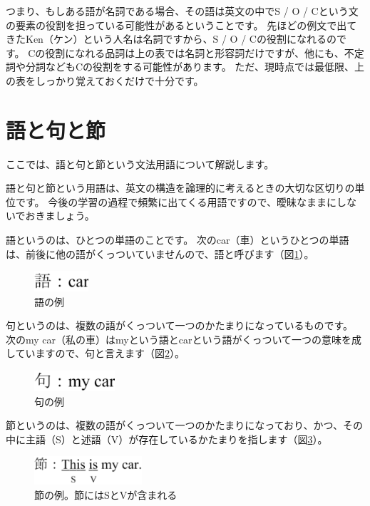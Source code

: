 \documentclass[12pt,titlepage]{jsarticle}
\begin{document}
 つまり、もしある語が名詞である場合、その語は英文の中でS / O / Cという文の要素の役割を担っている可能性があるということです。
 先ほどの例文で出てきたKen（ケン）という人名は名詞ですから、S / O / Cの役割になれるのです。
 Cの役割になれる品詞は上の表では名詞と形容詞だけですが、他にも、不定詞や分詞などもCの役割をする可能性があります。
 ただ、現時点では最低限、上の表をしっかり覚えておくだけで十分です。


 \section{語と句と節}
 ここでは、語と句と節という文法用語について解説します。
 
 語と句と節という用語は、英文の構造を論理的に考えるときの大切な区切りの単位です。
 今後の学習の過程で頻繁に出てくる用語ですので、曖昧なままにしないでおきましょう。

 語というのは、ひとつの単語のことです。
 次のcar（車）というひとつの単語は、前後に他の語がくっついていませんので、語と呼びます（図\ref{fig4}）。
  \begin{figure}[htbp]
   \begin{center}
    \includegraphics[width=2cm]{./figure/fig4.pdf}
    \caption{語の例}
    \label{fig4}
   \end{center}
  \end{figure}

  句というのは、複数の語がくっついて一つのかたまりになっているものです。
  次のmy car（私の車）はmyという語とcarという語がくっついて一つの意味を成していますので、句と言えます（図\ref{fig5}）。
  \begin{figure}[htbp]
   \begin{center}
    \includegraphics[width=3cm]{./figure/fig5.pdf}
    \caption{句の例}
    \label{fig5}
   \end{center}
  \end{figure}


  節というのは、複数の語がくっついて一つのかたまりになっており、かつ、その中に主語（S）と述語（V）が存在しているかたまりを指します（図\ref{fig6}）。
  \begin{figure}[htbp]
   \begin{center}
    \includegraphics[width=4cm]{./figure/fig6.pdf}
    \caption{節の例。節にはSとVが含まれる}
    \label{fig6}
   \end{center}
  \end{figure}
\end{document}
